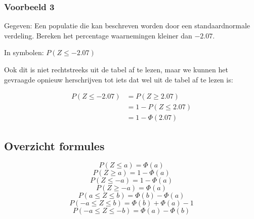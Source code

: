 \documentclass[12pt,twoside,a4paper]{article}
\begin{document}
\subsubsection*{Voorbeeld 3}

Gegeven: Een populatie die kan beschreven worden door een standaardnormale verdeling. Bereken het percentage waarnemingen kleiner dan $-2.07$.

In symbolen: $P(Z\leq -2.07)$

Ook dit is niet rechtstreeks uit de tabel af te lezen, maar we kunnen het gevraagde opnieuw herschrijven tot iets dat wel uit de tabel af te lezen is:

\begin{minipage}{0.5\textwidth}
\begin{align*}
  P(Z\leq -2.07) &= P(Z \geq 2.07)\\
                 &= 1 - P(Z \leq 2.07)\\
                 &= 1 - \Phi(2.07)
\end{align*}
\end{minipage}
\begin{minipage}{0.5\textwidth}
\vspace*{1cm}
\begin{center}
\end{center}
\end{minipage}

\pagebreak
\subsection{Overzicht formules}
\begin{multicols}{2}
  $$P(Z\leq a)=\Phi(a)$$
  $$P(Z\geq a)=1-\Phi(a)$$
  $$P(Z\leq -a)=1-\Phi(a)$$
  $$P(Z\geq -a)=\Phi(a)$$
  \vfill
  $$P(a\leq Z \leq b)=\Phi(b)-\Phi(a)$$
  $$P(-a\leq Z \leq b)=\Phi(b)+\Phi(a)-1$$
  $$P(-a\leq Z \leq -b)=\Phi(a)-\Phi(b)$$
\end{multicols}
\end{document}
